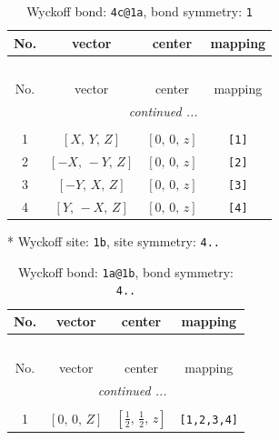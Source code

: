 \documentclass[fleqn,8pt]{jsarticle}
\begin{document}
\renewcommand{\arraystretch}{1.2}
\begin{longtable}{cccc}
\caption{Wyckoff bond: {\tt 4c@1a}, bond symmetry: {\tt 1}}
 \\
 \hline \hline
No. & vector & center & mapping \\ \hline \endfirsthead

\multicolumn{3}{l}{\tablename\ \thetable{}} \\
 \hline \hline
No. & vector & center & mapping \\ \hline \endhead

 \hline \hline
\multicolumn{3}{r}{\footnotesize\it continued ...} \\ \endfoot

 \hline \hline
\multicolumn{3}{r}{} \\ \endlastfoot

1 & $\left[ X,\, Y,\, Z \right]$ & $\left[ 0,\, 0,\, z \right]$ & {\tt [1]} \\ \hline
2 & $\left[ - X,\, - Y,\, Z \right]$ & $\left[ 0,\, 0,\, z \right]$ & {\tt [2]} \\ \hline
3 & $\left[ - Y,\, X,\, Z \right]$ & $\left[ 0,\, 0,\, z \right]$ & {\tt [3]} \\ \hline
4 & $\left[ Y,\, - X,\, Z \right]$ & $\left[ 0,\, 0,\, z \right]$ & {\tt [4]} \\
\end{longtable}
* Wyckoff site: {\tt 1b}, site symmetry: {\tt 4..}
\renewcommand{\arraystretch}{1.2}
\begin{longtable}{cccc}
\caption{Wyckoff bond: {\tt 1a@1b}, bond symmetry: {\tt 4..}}
 \\
 \hline \hline
No. & vector & center & mapping \\ \hline \endfirsthead

\multicolumn{3}{l}{\tablename\ \thetable{}} \\
 \hline \hline
No. & vector & center & mapping \\ \hline \endhead

 \hline \hline
\multicolumn{3}{r}{\footnotesize\it continued ...} \\ \endfoot

 \hline \hline
\multicolumn{3}{r}{} \\ \endlastfoot

1 & $\left[ 0,\, 0,\, Z \right]$ & $\left[ \frac{1}{2},\, \frac{1}{2},\, z \right]$ & {\tt [1,2,3,4]} \\
\end{longtable}
\renewcommand{\arraystretch}{1.2}
\end{document}
